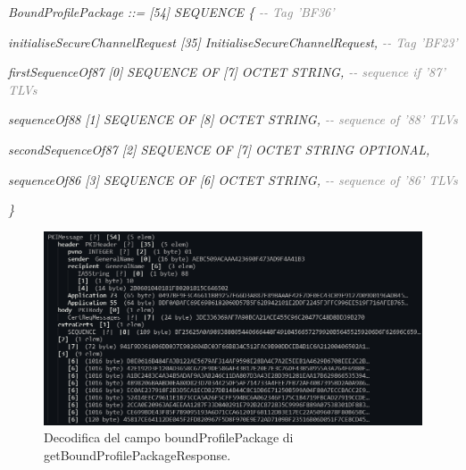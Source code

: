 \documentclass[10pt, oneside]{book}
\begin{document}
\textit{BoundProfilePackage ::= [54] SEQUENCE \{ \textcolor{gray}{{-}{-} Tag 'BF36'}}

\hspace{0.75cm} \textit{initialiseSecureChannelRequest [35] InitialiseSecureChannelRequest, \textcolor{gray}{{-}{-} Tag 'BF23'}}

\hspace{0.75cm} \textit{firstSequenceOf87 [0] SEQUENCE OF [7] OCTET STRING, \textcolor{gray}{{-}{-} sequence if '87' TLVs}}

\hspace{0.75cm} \textit{sequenceOf88 [1] SEQUENCE OF [8] OCTET STRING, \textcolor{gray}{{-}{-} sequence of '88' TLVs}}

\hspace{0.75cm} \textit{secondSequenceOf87 [2] SEQUENCE OF [7] OCTET STRING OPTIONAL,}

\hspace{0.75cm} \textit{sequenceOf86 [3] SEQUENCE OF [6] OCTET STRING, \textcolor{gray}{{-}{-} sequence of '86' TLVs}}

\textit{\}\\}

\begin{figure}
\includegraphics[width=\linewidth]{decode-boundProfilePackage.png}
\caption{Decodifica del campo boundProfilePackage di getBoundProfilePackageResponse.}
\label{fig:decode-boundProfilePackage}
\end{figure}
\end{document}
